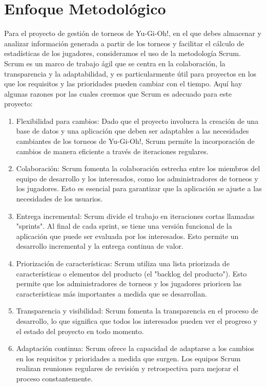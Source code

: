 \documentclass[a4paper]{article}
\begin{document}
\section{Enfoque Metodol\'ogico}
Para el proyecto de gestión de torneos de Yu-Gi-Oh!, en el que debes almacenar y analizar información generada a partir de los torneos y facilitar el cálculo de estadísticas de los jugadores, consideramos el uso de la metodología Scrum.
Scrum es un marco de trabajo ágil que se centra en la colaboración, la transparencia y la adaptabilidad, y es particularmente útil para proyectos en los que los requisitos y las prioridades pueden cambiar con el tiempo. Aquí hay algunas razones por las cuales creemos que Scrum es adecuado para este proyecto:
\begin{enumerate}
\item Flexibilidad para cambios: Dado que el proyecto involucra la creación de una base de datos y una aplicación que deben ser adaptables a las necesidades cambiantes de los torneos de Yu-Gi-Oh!, Scrum permite la incorporación de cambios de manera eficiente a través de iteraciones regulares.
\item Colaboración: Scrum fomenta la colaboración estrecha entre los miembros del equipo de desarrollo y los interesados, como los administradores de torneos y los jugadores. Esto es esencial para garantizar que la aplicación se ajuste a las necesidades de los usuarios.
\item Entrega incremental: Scrum divide el trabajo en iteraciones cortas llamadas "sprints". Al final de cada sprint, se tiene una versión funcional de la aplicación que puede ser evaluada por los interesados. Esto permite un desarrollo incremental y la entrega continua de valor.
\item Priorización de características: Scrum utiliza una lista priorizada de características o elementos del producto (el "backlog del producto"). Esto permite que los administradores de torneos y los jugadores prioricen las características más importantes a medida que se desarrollan.
\item Transparencia y visibilidad: Scrum fomenta la transparencia en el proceso de desarrollo, lo que significa que todos los interesados pueden ver el progreso y el estado del proyecto en todo momento.
\item Adaptación continua: Scrum ofrece la capacidad de adaptarse a los cambios en los requisitos y prioridades a medida que surgen. Los equipos Scrum realizan reuniones regulares de revisión y retrospectiva para mejorar el proceso constantemente.
\newpage

\end{enumerate}
\end{document}
